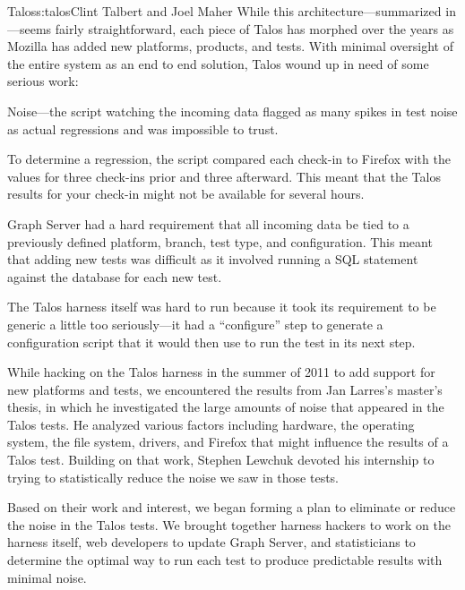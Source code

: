 \begin{aosachapter}{Talos}{s:talos}{Clint Talbert and Joel Maher}
While this architecture---summarized in
---seems fairly straightforward, each piece of
Talos has morphed over the years as Mozilla has added new platforms,
products, and tests. With minimal oversight of the entire system as an
end to end solution, Talos wound up in need of some serious work:

\begin{aosaitemize}

\item
  Noise---the script watching the incoming data flagged as many spikes
  in test noise as actual regressions and was impossible to trust.
\item
  To determine a regression, the script compared each check-in to
  Firefox with the values for three check-ins prior and three afterward.
  This meant that the Talos results for your check-in might not be
  available for several hours.
\item
  Graph Server had a hard requirement that all incoming data be tied to
  a previously defined platform, branch, test type, and configuration.
  This meant that adding new tests was difficult as it involved running
  a SQL statement against the database for each new test.
\item
  The Talos harness itself was hard to run because it took its
  requirement to be generic a little too seriously---it had a
  ``configure'' step to generate a configuration script that it would
  then use to run the test in its next step.
\end{aosaitemize}


While hacking on the Talos harness in the summer of 2011 to add support
for new platforms and tests, we encountered the results from Jan
Larres's master's thesis, in which he investigated the large amounts of
noise that appeared in the Talos tests. He analyzed various factors
including hardware, the operating system, the file system, drivers, and
Firefox that might influence the results of a Talos test. Building on
that work, Stephen Lewchuk devoted his internship to trying to
statistically reduce the noise we saw in those tests.

Based on their work and interest, we began forming a plan to eliminate
or reduce the noise in the Talos tests. We brought together harness
hackers to work on the harness itself, web developers to update Graph
Server, and statisticians to determine the optimal way to run each test
to produce predictable results with minimal noise.


\end{aosachapter}

